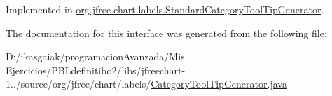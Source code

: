 Implemented in \mbox{\hyperlink{classorg_1_1jfree_1_1chart_1_1labels_1_1_standard_category_tool_tip_generator_afd101d9a9d6376c6bfb8eacdd51e99ad}{org.\+jfree.\+chart.\+labels.\+Standard\+Category\+Tool\+Tip\+Generator}}.



The documentation for this interface was generated from the following file\+:\begin{DoxyCompactItemize}
\item 
D\+:/ikasgaiak/programacion\+Avanzada/\+Mis Ejercicios/\+P\+B\+Ldefinitibo2/libs/jfreechart-\/1../source/org/jfree/chart/labels/\mbox{\hyperlink{_category_tool_tip_generator_8java}{Category\+Tool\+Tip\+Generator.\+java}}\end{DoxyCompactItemize}
